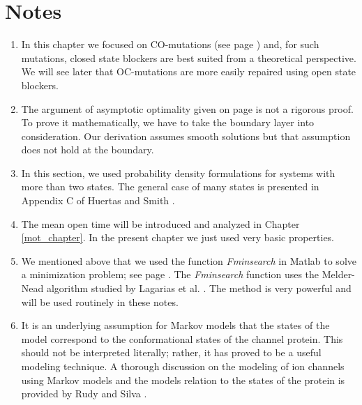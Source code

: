 \section{Notes}
\label{notesdrugs}

\begin{enumerate}
\item In this chapter we focused on CO-mutations (see page \pageref{com}) and, for such mutations, closed state blockers are best suited from a theoretical perspective. We will see later that OC-mutations are more easily repaired using open state blockers.
\item The argument of asymptotic optimality given on page \pageref{asymptotic} is not a rigorous proof. To prove it mathematically, we have to take the boundary layer into consideration. Our derivation assumes smooth solutions but that assumption does not hold at the boundary.
\item In this section, we used probability density formulations for systems with more than two states. The general  case of many states is presented in Appendix C of  Huertas and Smith \cite{Huertas2007}.
\item The mean open time will be introduced and analyzed in Chapter \ref{mot_chapter}. In the present chapter we just used very basic properties.
\item We mentioned above that we used the function \textit{Fminsearch} in Matlab to solve a minimization problem; see page  \pageref{Fminsearch}. The \textit{Fminsearch} function uses the Melder-Nead \cite{Nelder1965} algorithm studied by Lagarias et al. \cite{Lagarias1998}. The method is very powerful and will be used routinely in these notes. 
\item It is an underlying assumption for Markov models that the states of the model correspond to the conformational states of the channel protein. This should not be interpreted literally; rather, it has proved to be a useful modeling technique. A thorough discussion on the modeling of ion channels using Markov models and the models relation to the states of the protein is provided by Rudy and Silva \cite{Rudy2006}.
\end{enumerate}

